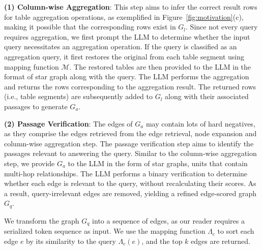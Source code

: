 \textbf{(1) Column-wise Aggregation}: 
This step aims to infer the correct result rows for table aggregation operations, as exemplified in Figure~\ref{fig:motivation}(c), making it possible that the corresponding rows exist in $G_l$. 
Since not every query requires aggregation, we first prompt the LLM to determine whether the input query necessitates an aggregation operation. 
If the query is classified as an aggregation query, it first restores the original from each table segment using mapping function $\mathcal{M}$. 
The restored tables are then provided to the LLM in the format of star graph along with the query. 
The LLM performs the aggregation and returns the rows corresponding to the aggregation result.
The returned rows (i.e., table segments) are subsequently added to $G_l$ along with their associated passages to generate $G_a$.


\textbf{(2) Passage Verification}: 
The edges of $G_a$ may contain lots of hard negatives, as they comprise the edges retrieved from the edge retrieval, node expansion and column-wise aggregation step.
The passage verification step aims to identify the passages relevant to answering the query.
Similar to the column-wise aggregation step, we provide $G_a$ to the LLM in the form of star graphs, units that contain multi-hop relationships.
The LLM performs a binary verification to determine whether each edge is relevant to the query, without recalculating their scores. 
As a result, query-irrelevant edges are removed, yielding a refined edge-scored graph $G_q$. 

We transform the graph $G_q$ into a sequence of edges, as our reader requires a serialized token sequence as input.
We use the mapping function $\Lambda_c$ to sort each edge $e$ by its similarity to the query $\Lambda_c(e)$, and the top $k$ edges are returned.

